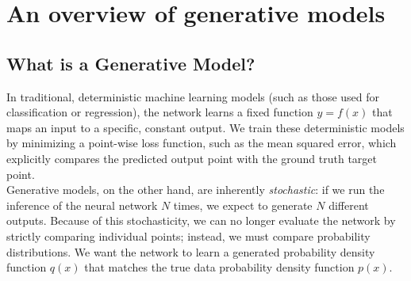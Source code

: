 \section{An overview of generative models}

\subsection{What is a Generative Model?}
In traditional, deterministic machine learning models (such as those used for classification or regression), the network learns a fixed function $y = f(x)$ that maps an input to a specific, constant output. We train these deterministic models by minimizing a point-wise loss function, such as the mean squared error, which explicitly compares the predicted output point with the ground truth target point. \\
Generative models, on the other hand, are inherently \textit{stochastic}: if we run the inference of the neural network $N$ times, we expect to generate $N$ different outputs. Because of this stochasticity, we can no longer evaluate the network by strictly comparing individual points; instead, we must compare probability distributions. We want the network to learn a generated probability density function $q(x)$ that matches the true data probability density function $p(x)$.

